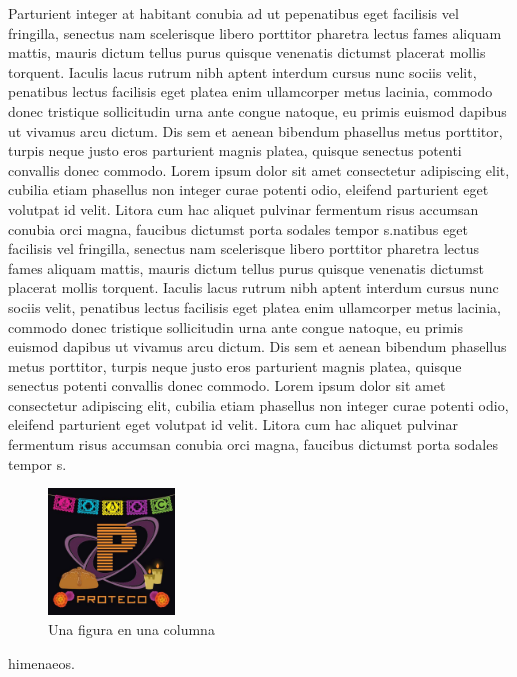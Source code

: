 \documentclass{article}
\begin{document}
\begin{multicols}{3}
			Parturient integer at habitant conubia ad ut pepenatibus eget facilisis vel fringilla, senectus nam scelerisque libero porttitor pharetra lectus fames aliquam mattis, mauris dictum tellus purus quisque venenatis dictumst placerat mollis torquent. Iaculis lacus rutrum nibh aptent interdum cursus nunc sociis velit, penatibus lectus facilisis eget platea enim ullamcorper metus lacinia, commodo donec tristique sollicitudin urna ante congue natoque, eu primis euismod dapibus ut vivamus arcu dictum. Dis sem et aenean bibendum phasellus metus porttitor, turpis neque justo eros parturient magnis platea, quisque senectus potenti convallis donec commodo.
			Lorem ipsum dolor sit amet consectetur adipiscing elit, cubilia etiam phasellus non integer curae potenti odio, eleifend parturient eget volutpat id velit. Litora cum hac aliquet pulvinar fermentum risus accumsan conubia orci magna, faucibus dictumst porta sodales tempor s.natibus eget facilisis vel fringilla, senectus nam scelerisque libero porttitor pharetra lectus fames aliquam mattis, mauris dictum tellus purus quisque venenatis dictumst placerat mollis torquent. Iaculis lacus rutrum nibh aptent interdum cursus nunc sociis velit, penatibus lectus facilisis eget platea enim ullamcorper metus lacinia, commodo donec tristique sollicitudin urna ante congue natoque, eu primis euismod dapibus ut vivamus arcu dictum. Dis sem et aenean bibendum phasellus metus porttitor, turpis neque justo eros parturient magnis platea, quisque senectus potenti convallis donec commodo.
			Lorem ipsum dolor sit amet consectetur adipiscing elit, cubilia etiam phasellus non integer curae potenti odio, eleifend parturient eget volutpat id velit. Litora cum hac aliquet pulvinar fermentum risus accumsan conubia orci magna, faucibus dictumst porta sodales tempor s.
				\begin{figure}[!htp] %
				\centering
				\includegraphics[width=0.3\textwidth]{img/proteco}
				\caption{Una figura en una columna}
				\label{fig:col2}
			\end{figure} himenaeos.
		

\end{multicols}
\end{document}
